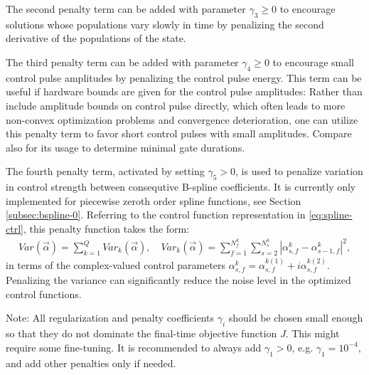 \documentclass[11pt]{article}
\begin{document}
The second penalty term can be added with parameter $\gamma_3 \geq 0$ to encourage solutions whose populations vary slowly in time by penalizing the second derivative of the populations of the state. 

The third penalty term can be added with parameter $\gamma_4 \geq 0$ to encourage small control pulse amplitudes by penalizing the control pulse energy. This term can be useful if hardware bounds are given for the control pulse amplitudes: Rather than include amplitude bounds on control pulse directly, which often leads to more non-convex optimization problems and convergence deterioration, one can utilize this penalty term to favor short control pulses with small amplitudes. Compare also \cite{gunther2023practical} for its usage to determine minimal gate durations.

The fourth penalty term, activated by setting $\gamma_5>0$, is used to penalize variation in control strength between consequtive B-spline coefficients. It is currently only implemented for piecewise zeroth order spline functions, see Section \ref{subsec:bspline-0}. Referring to the control function representation in \eqref{eq:spline-ctrl}, this penalty function takes the form:
\begin{align}
  Var(\vec{\alpha}) = \sum_{k=1}^Q Var_k(\vec{\alpha}),\quad Var_k(\vec{\alpha}) = \sum_{f=1}^{N_f^k} \sum_{s=2}^{N_s^k} |\alpha_{s,f}^k - \alpha_{s-1,f}^k|^2,
\end{align}
in terms of the complex-valued control parameters $\alpha_{s,f}^k = \alpha_{s,f}^{k(1)} + i \alpha_{s,f}^{k(2)}$. Penalizing the variance can significantly reduce the noise level in the optimized control functions.

Note: All regularization and penalty coefficients $\gamma_i$ should be chosen small enough so that they do not dominate the final-time objective function $J$. This might require some fine-tuning. It is recommended to always add $\gamma_1>0$, e.g. $\gamma_1 = 10^{-4}$, and add other penalties only if needed. 


\end{document}
